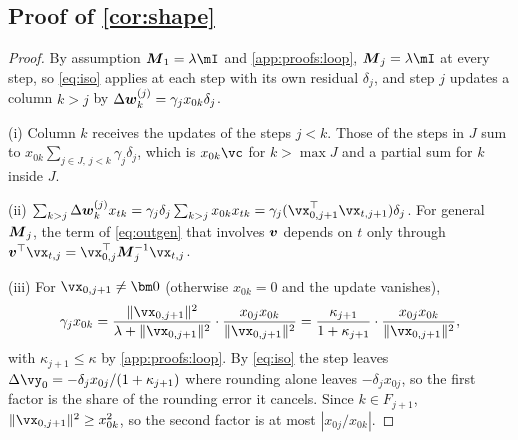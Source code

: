 \subsection{Proof of \texorpdfstring{\cref{cor:shape}}{Corollary 1}}
\label{app:proofs:shape}
\begin{proof}
By assumption $\mM_1=\lambda\mI$ and \cref{app:proofs:loop}, $\mM_j=\lambda\mI$ at every step, so \cref{eq:iso} applies at each step with its own residual $\delta_j$, and step $j$ updates a column $k>j$ by $\Delta\boldsymbol{w}^{(j)}_k=\gamma_jx_{0k}\delta_j$.

(i) Column $k$ receives the updates of the steps $j<k$.
Those of the steps in $J$ sum to $x_{0k}\sum_{j\in J,\,j<k}\gamma_j\delta_j$, which is $x_{0k}\vc$ for $k>\max J$ and a partial sum for $k$ inside $J$.

(ii) $\sum_{k>j}\Delta\vw^{(j)}_kx_{tk}=\gamma_j\delta_j\sum_{k>j}x_{0k}x_{tk}=\gamma_j(\vx_{0,j+1}^\top\vx_{t,j+1})\delta_j$.
For general $\boldsymbol{M}_j$, the term of \cref{eq:outgen} that involves $\boldsymbol{v}$ depends on $t$ only through $\vv^\top\vx_{t,j}=\vx_{0,j}^\top\mM_j^{-1}\vx_{t,j}$.

(iii) For $\vx_{0,j+1}\neq\bm0$ (otherwise $x_{0k}=0$ and the update vanishes),
\[
\gamma_jx_{0k}=\frac{\|\vx_{0,j+1}\|^2}{\lambda+\|\vx_{0,j+1}\|^2}\cdot\frac{x_{0j}x_{0k}}{\|\vx_{0,j+1}\|^2}
=\frac{\kappa_{j+1}}{1+\kappa_{j+1}}\cdot\frac{x_{0j}x_{0k}}{\|\vx_{0,j+1}\|^2},
\]
with $\kappa_{j+1}\le\kappa$ by \cref{app:proofs:loop}.
By \cref{eq:iso} the step leaves $\Delta\vy_0=-\delta_jx_{0j}/(1+\kappa_{j+1})$ where rounding alone leaves $-\delta_jx_{0j}$, so the first factor is the share of the \bos{} rounding error it cancels.
Since $k\in F_{j+1}$, $\|\vx_{0,j+1}\|^2\ge x_{0k}^2$, so the second factor is at most $|x_{0j}/x_{0k}|$.
\end{proof}


